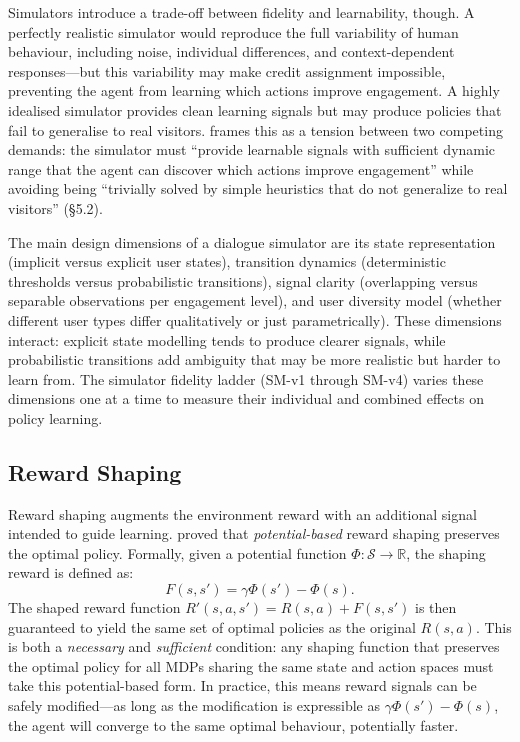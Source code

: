 \documentclass[a4paper, 11pt]{article}
\begin{document}
Simulators introduce a trade-off between fidelity and learnability, though. A perfectly realistic simulator would reproduce the full variability of human behaviour, including noise, individual differences, and context-dependent responses---but this variability may make credit assignment impossible, preventing the agent from learning which actions improve engagement. A highly idealised simulator provides clean learning signals but may produce policies that fail to generalise to real visitors. \citet{bourdon2024thesis} frames this as a tension between two competing demands: the simulator must ``provide learnable signals with sufficient dynamic range that the agent can discover which actions improve engagement'' while avoiding being ``trivially solved by simple heuristics that do not generalize to real visitors'' (\S5.2).

The main design dimensions of a dialogue simulator are its state representation (implicit versus explicit user states), transition dynamics (deterministic thresholds versus probabilistic transitions), signal clarity (overlapping versus separable observations per engagement level), and user diversity model (whether different user types differ qualitatively or just parametrically). These dimensions interact: explicit state modelling tends to produce clearer signals, while probabilistic transitions add ambiguity that may be more realistic but harder to learn from. The simulator fidelity ladder (SM-v1 through SM-v4) varies these dimensions one at a time to measure their individual and combined effects on policy learning.

\subsection{Reward Shaping}
\label{sec:bg_reward_shaping}

Reward shaping augments the environment reward with an additional signal intended to guide learning. \citet{ng1999policy} proved that \emph{potential-based} reward shaping preserves the optimal policy. Formally, given a potential function $\Phi: \mathcal{S} \to \mathbb{R}$, the shaping reward is defined as:
\begin{equation}
  \label{eq:pbrs}
  F(s, s') = \gamma \Phi(s') - \Phi(s).
\end{equation}
The shaped reward function $R'(s, a, s') = R(s, a) + F(s, s')$ is then guaranteed to yield the same set of optimal policies as the original $R(s, a)$. This is both a \emph{necessary} and \emph{sufficient} condition: any shaping function that preserves the optimal policy for all MDPs sharing the same state and action spaces must take this potential-based form. In practice, this means reward signals can be safely modified---as long as the modification is expressible as $\gamma \Phi(s') - \Phi(s)$, the agent will converge to the same optimal behaviour, potentially faster.
\end{document}
